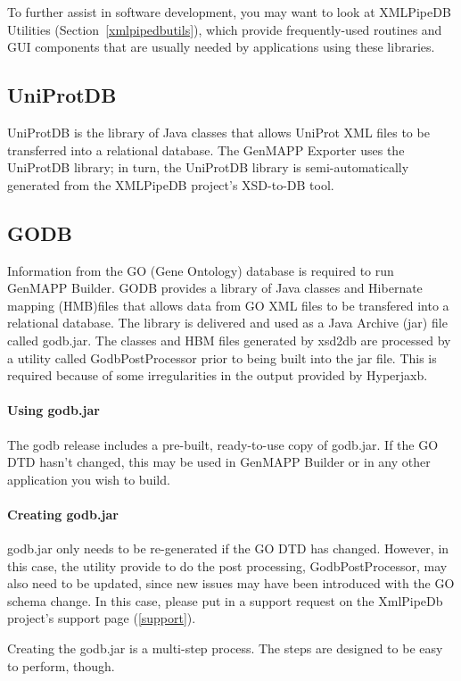 \documentclass[11pt]{article}
\begin{document}
To further assist in software development, you may want to look at XMLPipeDB Utilities (Section~\ref{xmlpipedbutils}), which provide frequently-used routines and GUI components that are usually needed by applications using these libraries.

\subsection{UniProtDB}

UniProtDB is the library of Java classes that allows UniProt XML files to be transferred into a relational database.  The GenMAPP Exporter uses the UniProtDB library; in turn, the UniProtDB library is semi-automatically generated from the XMLPipeDB project's XSD-to-DB tool.

\subsection{GODB}
Information from the GO (Gene Ontology) database is required to run GenMAPP Builder. GODB provides a library of Java classes and Hibernate mapping (HMB)files that allows data from GO XML files to be transfered into a relational database. The library is delivered and used as a Java Archive (jar) file called godb.jar. The classes and HBM files generated by xsd2db are processed by a utility called GodbPostProcessor prior to being built into the jar file. This is required because of some irregularities in the output provided by Hyperjaxb.

\paragraph{Using godb.jar}
The godb release includes a pre-built, ready-to-use copy of godb.jar. If the GO DTD hasn't changed, this may be used in GenMAPP Builder or in any other application you wish to build.

\paragraph{Creating godb.jar} 
godb.jar only needs to be re-generated if the GO DTD has changed. However, in this case, the utility provide to do the post processing, GodbPostProcessor, may also need to be updated, since new issues may have been introduced with the GO schema change. In this case, please put in a support request on the XmlPipeDb project's support page (\ref{support}).

Creating the godb.jar is a multi-step process. The steps are designed to be easy to perform, though.
\end{document}
